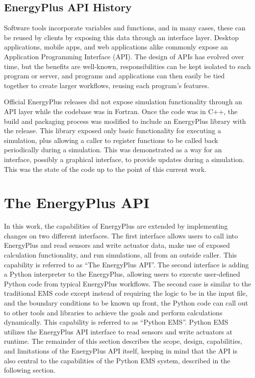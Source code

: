 \documentclass[5p]{elsarticle}
\begin{document}
  \subsection{EnergyPlus API History}
Software tools incorporate variables and functions, and in many cases, these can be reused by clients by exposing this data through an interface layer.  Desktop applications, mobile apps, and web applications alike commonly expose an Application Programming Interface (API).  The design of APIs has evolved over time, but the benefits are well-known, responsibilities can be kept isolated to each program or server, and programs and applications can then easily be tied together to create larger workflows, reusing each program’s features.

Official EnergyPlus releases did not expose simulation functionality through an API layer while the codebase was in Fortran.  Once the code was in C++, the build and packaging process was modified to include an EnergyPlus library with the release.  This library exposed only basic functionality for executing a simulation, plus allowing a caller to register functions to be called back periodically during a simulation.  This was demonstrated as a way for an interface, possibly a graphical interface, to provide updates during a simulation.  This was the state of the code up to the point of this current work.

 \section{The EnergyPlus API} 
In this work, the capabilities of EnergyPlus are extended by implementing changes on two different interfaces.  The first interface allows users to call into EnergyPlus and read sensors and write actuator data, make use of exposed calculation functionality, and run simulations, all from an outside caller.  This capability is referred to as “The EnergyPlus API”.  The second interface is adding a Python interpreter to the EnergyPlus, allowing users to execute user-defined Python code from typical EnergyPlus workflows.  The second case is similar to the traditional EMS code except instead of requiring the logic to be in the input file, and the boundary conditions to be known up front, the Python code can call out to other tools and libraries to achieve the goals and perform calculations dynamically.  This capability is referred to as “Python EMS”.  Python EMS utilizes the EnergyPlus API interface to read sensors and write actuators at runtime.  The remainder of this section describes the scope, design, capabilities, and limitations of the EnergyPlus API itself, keeping in mind that the API is also central to the capabilities of the Python EMS system, described in the following section.
 
\end{document}
